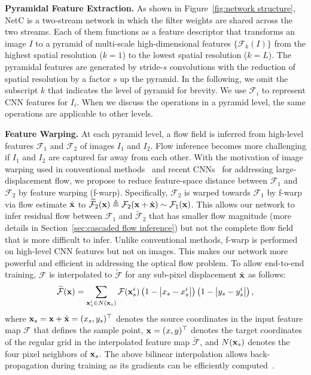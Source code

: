 \documentclass[10pt,twocolumn,letterpaper]{article}
\begin{document}
\vspace{0.1cm}
\noindent \textbf{Pyramidal Feature Extraction.} As shown in Figure~\ref{fig:network structure}, NetC is a two-stream network in which the filter weights are shared across the two streams. Each of them functions as a feature descriptor that transforms an image $I$ to a pyramid of multi-scale high-dimensional features $\{\mathcal{F}_{k}(I)\}$ from the highest spatial resolution ($k = 1$) to the lowest spatial resolution ($k = L$). The pyramidal features are generated by stride-$s$ convolutions with the reduction of spatial resolution by a factor $s$ up the pyramid. In the following, we omit the subscript $k$ that indicates the level of pyramid for brevity. We use $\mathcal{F}_{i}$ to represent CNN features for $I_{i}$. When we discuss the operations in a pyramid level, the same operations are applicable to other levels. 

\vspace{0.1cm}
\noindent \textbf{Feature Warping.} At each pyramid level, a flow field is inferred from high-level features $\mathcal{F}_{1}$ and ${\mathcal F}_{2}$ of images $I_{1}$ and $I_{2}$. Flow inference becomes more challenging if $I_{1}$ and $I_{2}$ are captured far away from each other. With the motivation of image warping used in conventional methods~\cite{Brox04, Papenberg06} and recent CNNs~\cite{Ilg17, Ranjan17} for addressing large-displacement flow, we propose to reduce feature-space distance between $\mathcal{F}_{1}$ and ${\mathcal F}_{2}$ by feature warping (f-warp). Specifically, ${\mathcal F}_{2}$ is warped towards ${\mathcal F}_{1}$ by f-warp via flow estimate $\dot{\bf x}$ to $\widetilde {\mathcal F}_{2}({\bf x}) \triangleq {\mathcal F}_{2}({\bf x}+\dot{\bf x}) \sim {\mathcal F}_{1}({\bf x})$. This allows our network to infer residual flow between ${\mathcal F}_{1}$ and $\widetilde {\mathcal F}_{2}$ that has smaller flow magnitude (more details in Section~\ref{sec:cascaded flow inference}) but not the complete flow field that is more difficult to infer.
%
Unlike conventional methods, f-warp is performed on high-level CNN features but not on images. This makes our network more powerful and efficient in addressing the optical flow problem. To allow end-to-end training, ${\mathcal F}$ is interpolated to ${\widetilde {\mathcal F}}$ for any sub-pixel displacement $\dot{\bf x}$ as follows:
%
\begin{equation}\label{bi interpolation}
\widetilde{\mathcal F}({\bf x}) = \sum_{{\bf x}_{s}^{i} \in N({\bf x}_{s})}{\mathcal F}({\bf x}_{s}^{i})\left(1-\left| x_{s} - x_{s}^{i}\right|\right) \left(1-\left| y_{s} - y_{s}^{i}\right|\right),
\end{equation}
%
where ${\bf x}_{s} = {\bf x}+\dot{\bf x} = (x_{s}, y_{s})^{\top}$ denotes the source coordinates in the input feature map ${\mathcal F}$ that defines the sample point, ${\bf x} = (x, y)^{\top}$ denotes the target coordinates of the regular grid in the interpolated feature map $\widetilde{\mathcal F}$, and $N({\bf x}_{s})$ denotes the four pixel neighbors of ${\bf x}_{s}$. The above bilinear interpolation allows back-propagation during training as its gradients can be efficiently computed~\cite{Jaderberg15}. 
\end{document}
